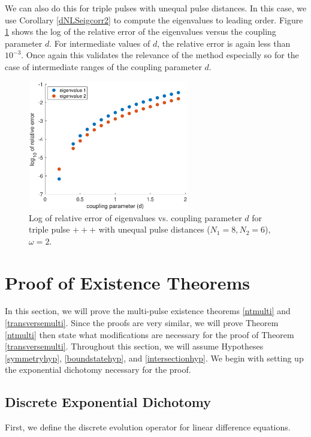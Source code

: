 \documentclass[12pt]{article}
\begin{document}
We can also do this for triple pulses with unequal pulse distances. In this case, we use Corollary \ref{dNLSeigcorr2} to compute the eigenvalues to leading order. Figure \ref{fig:error2} shows the log of the relative error of the eigenvalues versus the coupling parameter $d$.
For intermediate values of $d$, the relative error is again less than $10^{-3}$. Once again this validates the relevance
of the method especially so for the case of 
intermediate ranges of the coupling parameter $d$.

\begin{figure}[H]
\centering
\includegraphics[width=7cm]{errors3.eps}
\caption{Log of relative error of eigenvalues vs. coupling parameter $d$ for triple pulse $+++$ with unequal pulse distances ($N_1 = 8, N_2 = 6$), $\omega = 2$.}
\label{fig:error2}
\end{figure}

\section{Proof of Existence Theorems}

In this section, we will prove the multi-pulse existence theorems \ref{ntmulti} and \ref{transversemulti}. Since the proofs are very similar, we will prove Theorem \ref{ntmulti} then state what modifications are necessary for the proof of Theorem \ref{transversemulti}. Throughout this section, we will assume Hypotheses \ref{symmetryhyp}, \ref{boundstatehyp}, and \ref{intersectionhyp}. We begin with setting up the exponential dichotomy necessary for the proof.

\subsection{Discrete Exponential Dichotomy}

First, we define the discrete evolution operator for linear difference equations.
\end{document}
